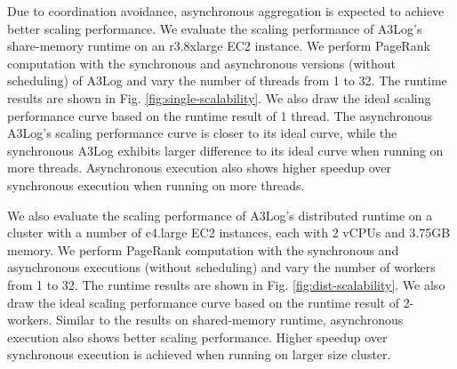 \begin{appendix}
 
 Due to coordination avoidance, asynchronous aggregation is expected to achieve better scaling performance. We evaluate the scaling performance of A3Log's share-memory runtime on an r3.8xlarge EC2 instance. We perform PageRank computation with the synchronous and asynchronous versions (without scheduling) of A3Log and vary the number of threads from 1 to 32. The runtime results are shown in Fig. \ref{fig:single-scalability}. We also draw the ideal scaling performance curve based on the runtime result of 1 thread. The asynchronous A3Log's scaling performance curve is closer to its ideal curve, while the synchronous A3Log exhibits larger difference to its ideal curve when running on more threads. Asynchronous execution also shows higher speedup over synchronous execution when running on more threads.
 
 We also evaluate the scaling performance of A3Log's distributed runtime on a cluster with a number of c4.large EC2 instances, each with 2 vCPUs and 3.75GB memory. We perform PageRank computation with the synchronous and asynchronous executions (without scheduling) and vary the number of workers from 1 to 32. The runtime results are shown in Fig. \ref{fig:dist-scalability}. We also draw the ideal scaling performance curve based on the runtime result of 2-workers. Similar to the results on shared-memory runtime, asynchronous execution also shows better scaling performance. Higher speedup over synchronous execution is achieved when running on larger size cluster.
 

\end{appendix}
